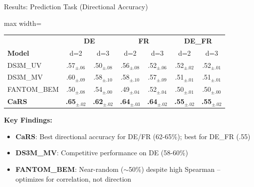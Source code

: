 \documentclass[aspectratio=169]{beamer}
\begin{document}
\begin{frame}{Results: Prediction Task (Directional Accuracy)}
\begin{table}
\centering
\small
\begin{adjustbox}{max width=\textwidth}
\begin{tabular}{l|cc|cc|cc}
\toprule
& \multicolumn{2}{c|}{\textbf{DE}} & \multicolumn{2}{c|}{\textbf{FR}} & \multicolumn{2}{c}{\textbf{DE\_FR}} \\
\textbf{Model} & d=2 & d=3 & d=2 & d=3 & d=2 & d=3 \\
\midrule
DS3M\_UV & .57$_{\pm.06}$ & .50$_{\pm.08}$ & .56$_{\pm.08}$ & .52$_{\pm.06}$ & .52$_{\pm.02}$ & .52$_{\pm.01}$ \\
DS3M\_MV & .60$_{\pm.09}$ & .58$_{\pm.10}$ & .58$_{\pm.10}$ & .57$_{\pm.09}$ & .51$_{\pm.01}$ & .51$_{\pm.01}$ \\
FANTOM\_BEM & .50$_{\pm.08}$ & .54$_{\pm.00}$ & .49$_{\pm.04}$ & .52$_{\pm.04}$ & .50$_{\pm.01}$ & .50$_{\pm.00}$ \\
\midrule
\textbf{CaRS} & \textbf{.65}$_{\pm.02}$ & \textbf{.62}$_{\pm.02}$ & \textbf{.64}$_{\pm.03}$ & \textbf{.64}$_{\pm.02}$ & \textbf{.55}$_{\pm.02}$ & \textbf{.55}$_{\pm.02}$ \\
\bottomrule
\end{tabular}
\end{adjustbox}
\end{table}


\vspace{0.2cm}
\textbf{Key Findings:}
\begin{itemize}
    \item \textbf{CaRS}: Best directional accuracy for DE/FR (62-65\%); best for DE\_FR (.55)
    \item \textbf{DS3M\_MV}: Competitive performance on DE (58-60\%)
    \item \textbf{FANTOM\_BEM}: Near-random ($\sim$50\%) despite high Spearman -- optimizes for correlation, not direction
\end{itemize}
\end{frame}
\end{document}
